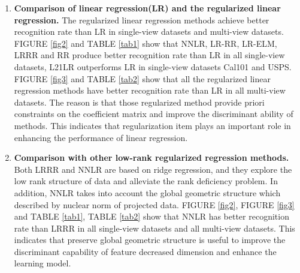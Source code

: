 \documentclass{ieeeaccess}
\begin{document}
\begin{enumerate}
  \item \textbf{Comparison of linear regression(LR) and the regularized linear regression.} The regularized linear regression methods achieve better recognition rate than LR in single-view datasets and multi-view datasets. FIGURE \ref{fig2} and TABLE \ref{tab1} show that NNLR, LR-RR, LR-ELM, LRRR and RR produce better recognition rate than LR in all single-view datasets, L21LR outperforms LR in single-view datasets Cal101 and USPS. FIGURE \ref{fig3} and TABLE \ref{tab2} show that all the regularized linear regression methods have better recognition rate than LR in all multi-view datasets. The reason is that those regularized method provide priori constraints on the coefficient matrix and improve the discriminant ability of methods. This indicates that regularization item plays an important role in enhancing the performance of linear regression.
  \item \textbf{Comparison with other low-rank regularized regression methods.} Both LRRR and NNLR are based on ridge regression, and they explore the low rank structure of data and alleviate the rank deficiency problem.  In addition, NNLR takes into account the global geometric structure which described by nuclear norm of projected data. FIGURE \ref{fig2}, FIGURE \ref{fig3} and TABLE \ref{tab1}, TABLE \ref{tab2} show that NNLR has better recognition rate than LRRR in all single-view datasets and all multi-view datasets. This indicates that preserve global geometric structure is useful to improve the discriminant capability of feature decreased dimension and enhance the learning model.


\end{enumerate}
\end{document}
